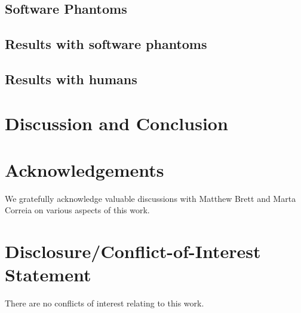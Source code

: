 \documentclass{bioinfo}
\begin{document}
\subsection{Software Phantoms\label{sub:Digital-Phantoms}}

\subsection{Results with software phantoms}

\subsection{Results with humans}

\section{Discussion and Conclusion}

\section*{Acknowledgements}
We gratefully acknowledge valuable discussions with Matthew Brett and Marta Correia on various aspects of this work.

\section*{Disclosure/Conflict-of-Interest Statement}
There are no conflicts of interest relating to this work.

%

%
%
%
%

\end{document}
